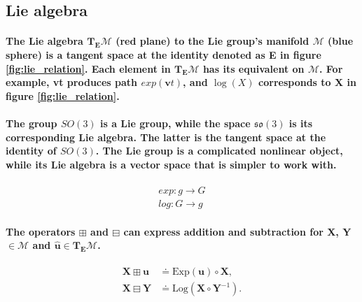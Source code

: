 \subsection{Lie algebra}
\paragraph{\textnormal{The Lie algebra $\textbf{T}_\textbf{E}\mathcal{M}$ (red plane) to the Lie group's manifold $\mathcal{M}$ (blue sphere) is a tangent space at the identity denoted as \textbf{E} in figure \ref{fig:lie_relation}. Each element in $\textbf{T}_\textbf{E}\mathcal{M}$ has its equivalent on $\mathcal{M}$. For example, \textbf{v}t produces path $exp(\textbf{v}t)$, and $\log(X)$ corresponds to \textbf{X} in figure \ref{fig:lie_relation}. }}

\paragraph{\textnormal{The group \( SO(3) \) is a Lie group, while the space \( \mathfrak{so}(3) \) is its corresponding Lie algebra. The latter is the tangent space at the identity of \( SO(3) \). The Lie group is a complicated nonlinear object, while its Lie algebra is a vector space that is simpler to work with.}}

\begin{equation}
	\begin{aligned}
		exp:g \longrightarrow G \\
		log:G \longrightarrow g
	\end{aligned}
\label{eq:mapping}
\end{equation}

\paragraph{\textnormal{The operators $\boxplus$ and $\boxminus$ can express addition and subtraction for \textbf{X}, \textbf{Y} $\in \mathcal{M}$ and $\hat{\textbf{u}} \in \textbf{T}_\textbf{E}\mathcal{M}$. }}

\begin{equation}
	\begin{aligned}
		\mathbf{X} \boxplus \mathbf{u} &\doteq \mathrm{Exp}(\mathbf{u}) \circ \mathbf{X}, \\
		\mathbf{X} \boxminus \mathbf{Y} &\doteq \mathrm{Log}(\mathbf{X} \circ \mathbf{Y}^{-1}).
	\end{aligned}
\end{equation}



